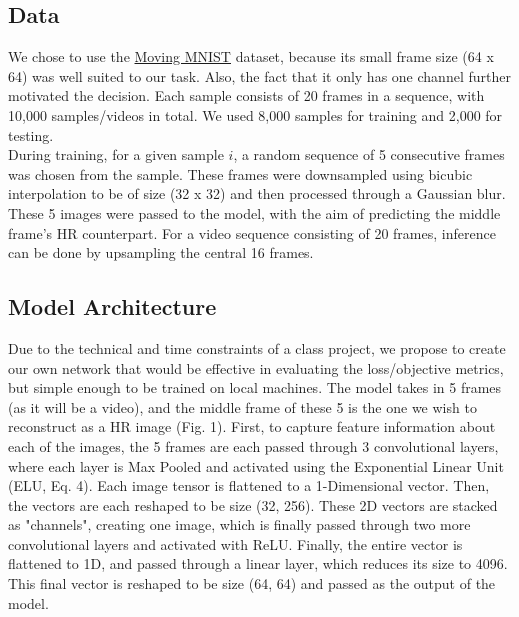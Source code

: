 \documentclass{article}
\begin{document}
\subsection{Data}

We chose to use the \href{https://www.cs.toronto.edu/~nitish/unsupervised_video/}{Moving MNIST} dataset, because its small frame size (64 x 64) was well suited to our task. Also, the fact that it only has one channel further motivated the decision. Each sample consists of 20 frames in a sequence, with 10,000 samples/videos in total. We used 8,000 samples for training and 2,000 for testing. \\

During training, for a given sample \(i\), a random sequence of 5 consecutive frames was chosen from the sample. These frames were downsampled using bicubic interpolation to be of size (32 x 32) and then processed through a Gaussian blur. These 5 images were passed to the model, with the aim of predicting the middle frame's HR counterpart. For a video sequence consisting of 20 frames, inference can be done by upsampling the central 16 frames.

\subsection{Model Architecture}

Due to the technical and time constraints of a class project, we propose to create our own network that would be effective in evaluating the loss/objective metrics, but simple enough to be trained on local machines. The model takes in 5 frames (as it will be a video), and the middle frame of these 5 is the one we wish to reconstruct as a HR image (Fig. 1). First, to capture feature information about each of the images, the 5 frames are each passed through 3 convolutional layers, where each layer is Max Pooled and activated using the Exponential Linear Unit (ELU, Eq. 4). Each image tensor is flattened to a 1-Dimensional vector. Then, the vectors are each reshaped to be size (32, 256). These 2D vectors are stacked as "channels", creating one image, which is finally passed through two more convolutional layers and activated with ReLU. Finally, the entire vector is flattened to 1D, and passed through a linear layer, which reduces its size to 4096. This final vector is reshaped to be size (64, 64) and passed as the output of the model. 
\end{document}
